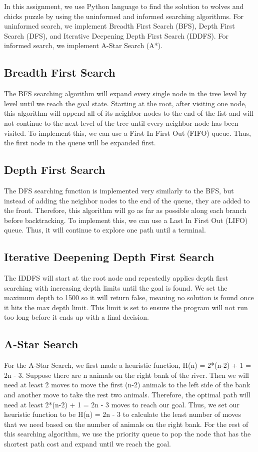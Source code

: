 \documentclass[onecolumn,draftclsnofoot, 10pt, compsoc]{IEEEtran}
\begin{document}
    In this assignment, we use Python language to find the solution to wolves and chicks puzzle by using the uninformed and informed searching algorithms. For uninformed search, we implement Breadth First Search (BFS), Depth First Search (DFS), and Iterative Deepening Depth First Search (IDDFS). For informed search, we implement A-Star Search (A*). 
    
	\subsection{Breadth First Search}
	The BFS searching algorithm will expand every single node in the tree level by level until we reach the goal state. Starting at the root, after visiting one node, this algorithm will append all of its neighbor nodes to the end of the list and will not continue to the next level of the tree until every neighbor node has been visited. To implement this, we can use a First In First Out (FIFO) queue. Thus, the first node in the queue will be expanded first.
	
	\subsection{Depth First Search}
	The DFS searching function is implemented very similarly to the BFS, but instead of adding the neighbor nodes to the end of the queue, they are added to the front. Therefore, this algorithm will go as far as possible along each branch before backtracking. To implement this, we can use a Last In First Out (LIFO) queue. Thus, it will continue to explore one path until a terminal.

    \subsection{Iterative Deepening Depth First Search}
    The IDDFS will start at the root node and repeatedly applies depth first searching with increasing depth limits until the goal is found. We set the maximum depth to 1500 so it will return false, meaning no solution is found once it hits the max depth limit. This limit is set to ensure the program will not run too long before it ends up with a final decision.

	
	\subsection{A-Star Search}
	For the A-Star Search, we first made a heuristic function, H(n) = 2*(n-2) + 1 = 2n - 3. Suppose there are n animals on the right bank of the river. Then we will need at least 2 moves to move the first (n-2) animals to the left side of the bank and another move to take the rest two animals. Therefore, the optimal path will need at least 2*(n-2) + 1 = 2n - 3 moves to reach our goal. Thus, we set our heuristic function to be H(n) = 2n - 3 to calculate the least number of moves that we need based on the number of animals on the right bank. For the rest of this searching algorithm, we use the priority queue to pop the node that has the shortest path cost and expand until we reach the goal.  
	
\end{document}
